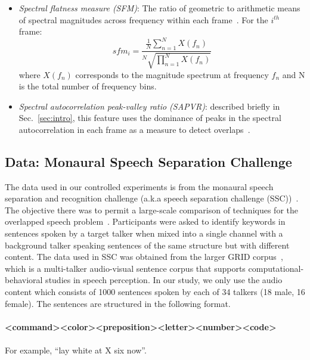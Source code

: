 {\begin{itemize}
\begin{equation}
\label{eq:kurtosis}
k_x = \frac{E\{x^4\}}{(E\{x^2\})^2}
\end{equation}
\vspace{1mm}
In this case $x$ refers to speech samples in a given frame. 
  \item {\it Spectral flatness measure (SFM)}: The ratio of geometric to arithmetic means of spectral magnitudes across frequency within each frame~\cite{nav_icassp13}. For the $i^{th}$ frame:
\begin{equation}
\label{eq:kurtosis}
sfm_i = \frac{\frac{1}{N}\sum_{n=1}^{N}{X(f_n)}}{^N\sqrt{\prod_{n=1}^{N}{X(f_n)}}}
\end{equation}
\vspace{1mm}
where $X(f_n)$ corresponds to the magnitude spectrum at frequency $f_n$ and {N} is the total number of frequency bins. 
  \item {\it Spectral autocorrelation peak-valley ratio (SAPVR)}: described briefly in Sec.~\ref{sec:intro}, this feature uses the dominance of peaks in the spectral autocorrelation in each frame as a measure to detect overlaps~\cite{sapvr_2000}. 
\end{itemize}

\subsection{Data: Monaural Speech Separation Challenge}
The data used in our controlled experiments is from the monaural speech separation and recognition challenge (a.k.a speech separation challenge (SSC))~\cite{cooke20101}. 
The objective there was to permit a large-scale comparison of techniques for the overlapped speech problem~\cite{cooke20101}. 
Participants were asked to identify keywords in sentences spoken by a target talker when mixed into a single channel with a background talker speaking sentences of the same structure but with different content. 
The data used in SSC was obtained from the larger GRID corpus~\cite{cooke_JASA_SSCD}, which is a multi-talker audio-visual sentence corpus that supports computational-behavioral studies in speech perception. 
In our study, we only use the audio content which consists of 1000 sentences spoken by each of 34 talkers (18 male, 16 female). The sentences are structured in the following format.
\\\\
{\small \bf \textless command\textgreater\textless color\textgreater\textless preposition\textgreater\textless letter\textgreater\textless number\textgreater\textless code\textgreater}
\\\\
For example, ``lay white at X six now''.

}
